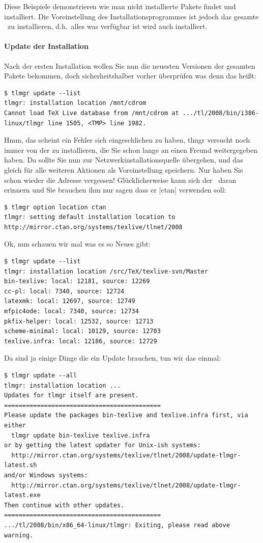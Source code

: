 Diese Beispiele demonstrieren wie man nicht installierte Pakete findet
und installiert. Die Voreinstellung des Installationsprogrammes ist
jedoch das gesamte \tl\ zu installieren, d.h.\ alles was verfügbar ist
wird auch installiert.

\paragraph{Update der Installation}

Nach der ersten Installation wollen Sie nun die neuesten Versionen der
gesamten Pakete bekommen, doch sicherheitshalber vorher überprüfen
was denn das heißt:
\begin{lstlisting}
$ tlmgr update --list
tlmgr: installation location /mnt/cdrom
Cannot load TeX Live database from /mnt/cdrom at .../tl/2008/bin/i386-linux/tlmgr line 1505, <TMP> line 1982.
\end{lstlisting}
Hmm, das scheint ein Fehler sich eingeschlichen zu haben, tlmgr versucht
noch immer von der  zu installieren, die Sie schon lange
an einen Freund weitergegeben haben. Da sollte Sie nun zur
Netzwerkinstallationsquelle übergehen, und das gleich für alle weiteren
Aktionen als Voreinstellung speichern. Nur haben Sie schon wieder die
Adresse vergessen! Glücklicherweise kann sich der \tlmgr\ daran erinnern
und Sie brauchen ihm nur sagen dass er |ctan| verwenden soll:
\begin{lstlisting}
$ tlmgr option location ctan
tlmgr: setting default installation location to http://mirror.ctan.org/systems/texlive/tlnet/2008
\end{lstlisting}
Ok, nun schauen wir mal was es so Neues gibt:
\begin{lstlisting}
$ tlmgr update --list
tlmgr: installation location /src/TeX/texlive-svn/Master
bin-texlive: local: 12181, source: 12269
cc-pl: local: 7340, source: 12724
latexmk: local: 12697, source: 12749
mfpic4ode: local: 7340, source: 12734
pkfix-helper: local: 12532, source: 12713
scheme-minimal: local: 10129, source: 12703
texlive.infra: local: 12186, source: 12729
\end{lstlisting}
Da sind ja einige Dinge die ein Update brauchen, tun wir das einmal:
\begin{lstlisting}
$ tlmgr update --all
tlmgr: installation location ...
Updates for tlmgr itself are present.
===========================================
Please update the packages bin-texlive and texlive.infra first, via either
  tlmgr update bin-texlive texlive.infra
or by getting the latest updater for Unix-ish systems:
  http://mirror.ctan.org/systems/texlive/tlnet/2008/update-tlmgr-latest.sh
and/or Windows systems:
  http://mirror.ctan.org/systems/texlive/tlnet/2008/update-tlmgr-latest.exe
Then continue with other updates.
===========================================
.../tl/2008/bin/x86_64-linux/tlmgr: Exiting, please read above warning.
\end{lstlisting}

